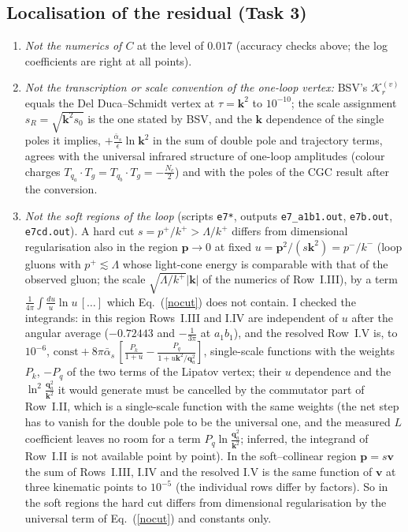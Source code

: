 \documentclass[11pt,a4paper]{article}
\renewcommand{\v}[1]{\bm{#1}}
\newcommand{\ab}{\bar\alpha_s}
\begin{document}
\subsection{Localisation of the residual (Task 3)}
\begin{enumerate}
\item \emph{Not the numerics of $C$} at the level of $0.017$ (accuracy checks above; the log coefficients are right at all points).
\item \emph{Not the transcription or scale convention of the one-loop vertex:} BSV's $\mathcal K^{(v)}_r$ equals the Del Duca--Schmidt vertex at $\tau=\v k^2$ to $10^{-10}$; the scale assignment $s_{R}=\sqrt{\v k^2s_0}$ is the one stated by BSV, and the $\v k$ dependence of the single poles it implies, $+\frac{\ab}{\epsilon}\ln\v k^2$ in the sum of double pole and trajectory terms, agrees with the universal infrared structure of one-loop amplitudes (colour charges $T_{q_a}\cdot T_g=T_{q_b}\cdot T_g=-\frac{N_c}2$) and with the poles of the CGC result after the conversion.
\item \emph{Not the soft regions of the loop} (scripts \texttt{e7*}, outputs \texttt{e7\_a1b1.out}, \texttt{e7b.out}, \texttt{e7cd.out}). A hard cut $s=p^+/k^+>\Lambda/k^+$ differs from dimensional regularisation also in the region $\v p\to0$ at fixed $u=\v p^2/(s\v k^2)=p^-/k^-$ (loop gluons with $p^+\lesssim\Lambda$ whose light-cone energy is comparable with that of the observed gluon; the scale $\sqrt{\Lambda/k^+}|\v k|$ of the numerics of Row~I.III), by a term $\frac{1}{4\pi}\int\frac{du}{u}\ln u\,[\dots]$ which Eq.~(\ref{nocut}) does not contain. I checked the integrands: in this region Rows~I.III and I.IV are independent of $u$ after the angular average ($-0.72443$ and $-\frac1{3\pi}$ at $a_1b_1$), and the resolved Row~I.V is, to $10^{-6}$, $\text{const}+8\pi\ab\,[\frac{P_k}{1+u}-\frac{P_q}{1+u\v k^2/\v q_a^2}]$, single-scale functions with the weights $P_k$, $-P_q$ of the two terms of the Lipatov vertex; their $u$ dependence and the $\ln^2\frac{\v q_a^2}{\v k^2}$ it would generate must be cancelled by the commutator part of Row~I.II, which is a single-scale function with the same weights (the net step has to vanish for the double pole to be the universal one, and the measured $L$ coefficient leaves no room for a term $P_q\ln\frac{\v q_a^2}{\v k^2}$; inferred, the integrand of Row~I.II is not available point by point). In the soft--collinear region $\v p=s\v v$ the sum of Rows~I.III, I.IV and the resolved I.V is the same function of $\v v$ at three kinematic points to $10^{-5}$ (the individual rows differ by factors). So in the soft regions the hard cut differs from dimensional regularisation by the universal term of Eq.~(\ref{nocut}) and constants only.

\end{enumerate}
\end{document}
